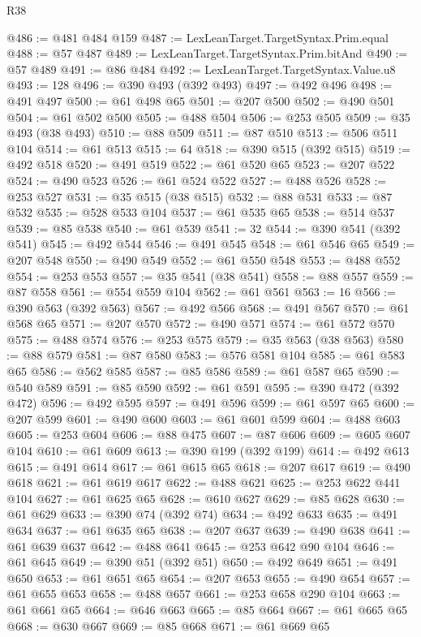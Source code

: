 \begin{lexlean}{R38}
\begin{coremodule}
@486 := @481 @484 @159
@487 := LexLeanTarget.TargetSyntax.Prim.equal
@488 := @57 @487
@489 := LexLeanTarget.TargetSyntax.Prim.bitAnd
@490 := @57 @489
@491 := @86 @484
@492 := LexLeanTarget.TargetSyntax.Value.u8
@493 := 128
@496 := @390 @493 (@392 @493)
@497 := @492 @496
@498 := @491 @497
@500 := @61 @498 @65
@501 := @207 @500
@502 := @490 @501
@504 := @61 @502 @500
@505 := @488 @504
@506 := @253 @505
@509 := @35 @493 (@38 @493)
@510 := @88 @509
@511 := @87 @510
@513 := @506 @511 @104
@514 := @61 @513
@515 := 64
@518 := @390 @515 (@392 @515)
@519 := @492 @518
@520 := @491 @519
@522 := @61 @520 @65
@523 := @207 @522
@524 := @490 @523
@526 := @61 @524 @522
@527 := @488 @526
@528 := @253 @527
@531 := @35 @515 (@38 @515)
@532 := @88 @531
@533 := @87 @532
@535 := @528 @533 @104
@537 := @61 @535 @65
@538 := @514 @537
@539 := @85 @538
@540 := @61 @539
@541 := 32
@544 := @390 @541 (@392 @541)
@545 := @492 @544
@546 := @491 @545
@548 := @61 @546 @65
@549 := @207 @548
@550 := @490 @549
@552 := @61 @550 @548
@553 := @488 @552
@554 := @253 @553
@557 := @35 @541 (@38 @541)
@558 := @88 @557
@559 := @87 @558
@561 := @554 @559 @104
@562 := @61 @561
@563 := 16
@566 := @390 @563 (@392 @563)
@567 := @492 @566
@568 := @491 @567
@570 := @61 @568 @65
@571 := @207 @570
@572 := @490 @571
@574 := @61 @572 @570
@575 := @488 @574
@576 := @253 @575
@579 := @35 @563 (@38 @563)
@580 := @88 @579
@581 := @87 @580
@583 := @576 @581 @104
@585 := @61 @583 @65
@586 := @562 @585
@587 := @85 @586
@589 := @61 @587 @65
@590 := @540 @589
@591 := @85 @590
@592 := @61 @591
@595 := @390 @472 (@392 @472)
@596 := @492 @595
@597 := @491 @596
@599 := @61 @597 @65
@600 := @207 @599
@601 := @490 @600
@603 := @61 @601 @599
@604 := @488 @603
@605 := @253 @604
@606 := @88 @475
@607 := @87 @606
@609 := @605 @607 @104
@610 := @61 @609
@613 := @390 @199 (@392 @199)
@614 := @492 @613
@615 := @491 @614
@617 := @61 @615 @65
@618 := @207 @617
@619 := @490 @618
@621 := @61 @619 @617
@622 := @488 @621
@625 := @253 @622 @441 @104
@627 := @61 @625 @65
@628 := @610 @627
@629 := @85 @628
@630 := @61 @629
@633 := @390 @74 (@392 @74)
@634 := @492 @633
@635 := @491 @634
@637 := @61 @635 @65
@638 := @207 @637
@639 := @490 @638
@641 := @61 @639 @637
@642 := @488 @641
@645 := @253 @642 @90 @104
@646 := @61 @645
@649 := @390 @51 (@392 @51)
@650 := @492 @649
@651 := @491 @650
@653 := @61 @651 @65
@654 := @207 @653
@655 := @490 @654
@657 := @61 @655 @653
@658 := @488 @657
@661 := @253 @658 @290 @104
@663 := @61 @661 @65
@664 := @646 @663
@665 := @85 @664
@667 := @61 @665 @65
@668 := @630 @667
@669 := @85 @668
@671 := @61 @669 @65

\end{coremodule}
\end{lexlean}

